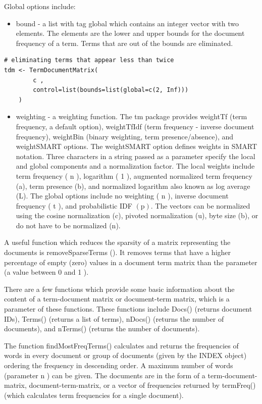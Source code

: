 \documentclass[11pt,openany,executivepaper]{book}
\begin{document}
Global options include:

\begin{itemize}
  \item bound - a list with tag global which contains an integer vector with two elements. The elements are the lower and upper bounds for the document frequency of a term. Terms that are out of the bounds are eliminated.
\end{itemize}

\begin{verbatim}
# eliminating terms that appear less than twice
tdm <- TermDocumentMatrix(
        c ,
        control=list(bounds=list(global=c(2, Inf)))
    )
\end{verbatim}

\begin{itemize}
  \item weighting - a weighting function. The tm package provides weightTf (term frequency, a default option), weightTfIdf (term frequency - inverse document frequency), weightBin (binary weighting, term presence/absence), and weightSMART options. The weightSMART option defines weights in SMART notation. Three characters in a string passed as a parameter specify the local and global components and a normalization factor. The local weights include term frequency ( n ), logarithm ( 1 ), augmented normalized term frequency (a), term presence (b), and normalized logarithm also known as log average (L). The global options include no weighting ( n ), inverse document frequency ( t ), and probabilistic IDF $(\mathrm{p})$. The vectors can be normalized using the cosine normalization (c), pivoted normalization (u), byte size (b), or do not have to be normalized (n).
\end{itemize}

A useful function which reduces the sparsity of a matrix representing the documents is removeSparseTerms (). It removes terms that have a higher percentage of empty (zero) values in a document term matrix than the parameter (a value between 0 and 1 ).

There are a few functions which provide some basic information about the content of a term-document matrix or document-term matrix, which is a parameter of these functions. These functions include Docs() (returns document IDs), Terms() (returns a list of terms), nDocs() (returns the number of documents), and nTerms() (returns the number of documents).

The function findMostFreqTerms() calculates and returns the frequencies of words in every document or group of documents (given by the INDEX object) ordering the frequency in descending order. A maximum number of words (parameter n ) can be given. The documents are in the form of a term-document-matrix, document-term-matrix, or a vector of frequencies returned by termFreq()(which calculates term frequencies for a single document).
\end{document}
